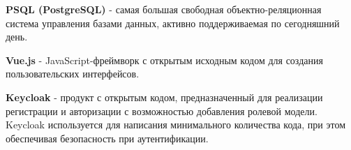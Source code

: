         \textbf{PSQL (PostgreSQL)} - самая большая свободная объектно-реляционная система управления базами данных, активно поддерживаемая по сегодняшний день.
    
        \textbf{Vue.js} - JavaScript-фреймворк с открытым исходным кодом для создания пользовательских интерфейсов.
    
        \textbf{Keycloak} - продукт с открытым кодом, предназначенный для реализации регистрации и авторизации с возможностью добавления ролевой модели. Keycloak используется для написания минимального количества кода, при этом обеспечивая безопасность при аутентификации.
    

\clearpage